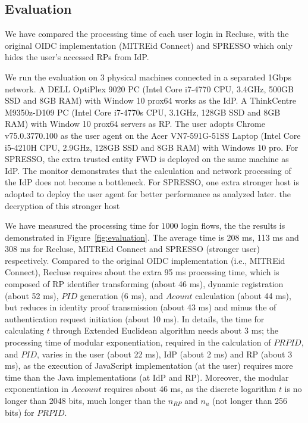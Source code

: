 \subsection{Evaluation}
\label{sec:evaluation}
We have compared the processing time of each user login in Recluse, with the original OIDC implementation (MITREid Connect) and SPRESSO which only hides the user's accessed RPs from IdP.

 We run the evaluation on 3 physical machines connected in a separated 1Gbps network. A DELL OptiPlex 9020 PC (Intel Core i7-4770 CPU, 3.4GHz, 500GB SSD and 8GB RAM) with Window 10 prox64 works as the IdP. A ThinkCentre M9350z-D109 PC (Intel Core i7-4770s CPU, 3.1GHz, 128GB SSD and 8GB RAM) with  Window 10 prox64 servers as RP. The user adopts Chrome v75.0.3770.100 as the user agent on the Acer VN7-591G-51SS Laptop (Intel Core i5-4210H CPU, 2.9GHz, 128GB SSD and 8GB RAM) with  Windows 10 pro. For SPRESSO, the extra trusted entity FWD is deployed on the same machine as IdP. The monitor demonstrates that  the calculation and network processing of the IdP does not become a bottleneck. For SPRESSO, one extra stronger host is adopted to deploy the user agent for better performance as analyzed later. {\color{red} the decryption of this stronger host}

 We have measured the processing time for $1000$ login flows, the the results is demonstrated in Figure~\ref{fig:evaluation}. The average time is 208 ms, 113 ms and 308 ms for Recluse, MITREid Connect and SPRESSO (stronger user) respectively. Compared to the original OIDC implementation (i.e., MITREid Connect), Recluse requires about the extra 95 ms processing time, which is composed of RP identifier transforming (about 46 ms), dynamic registration (about 52 ms), $PID$ generation (6 ms), and $Acount$ calculation (about 44 ms), but reduces in identity proof transmission (about 43 ms) and minus the of authentication request initiation (about 10 ms). In details, the time for calculating $t$ through Extended Euclidean algorithm needs about 3 ms; the processing time of modular exponentiation, required in the calculation of $PRPID$, and $PID$, varies in the user (about 22 ms), IdP (about 2 ms) and RP (about 3 ms), as the execution of  JavaScript implementation (at the user) requires more time than the Java implementations (at IdP and RP). Moreover, the modular exponentiation in $Account$ requires about 46 ms, as the discrete logarithm $t$ is no longer than 2048 bits, much longer than the $n_{RP}$ and $n_{u}$ (not longer than 256 bits) for $PRPID$.

